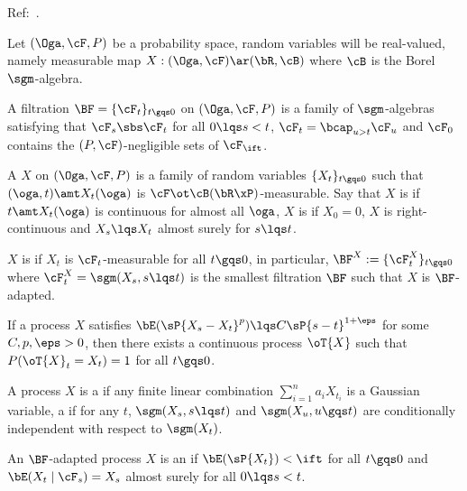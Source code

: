 \documentclass[article, a4paper, twoside]{universal}
\begin{document}
\confighead{}{}{}

Ref:~\cite{JYC2009}.


\begin{stp}
    Let $(\Oga,\cF,P)$ be a probability space, random variables will be real-valued, namely measurable map $X:(\Oga,\cF)\ar(\bR,\cB)$ where $\cB$ is the Borel $\sgm$-algebra.

    A filtration $\BF=\{\cF_{t}\}_{t\gqs0}$ on $(\Oga,\cF,P)$ is a family of $\sgm$-algebras satisfying that $\cF_{s}\sbs\cF_{t}$ for all $0\lqs s < t$, $\cF_{t}=\bcap_{u>t}\cF_{u}$ and $\cF_{0}$ contains the $(P,\cF)$-negligible sets of $\cF_{\ift}$.
\end{stp}

\begin{dfn}[1.1.10]
    A  $X$ on $(\Oga,\cF,P)$ is a family of random variables $\{X_{t}\}_{t\gqs0}$ such that $(\oga,t)\amt X_{t}(\oga)$ is $\cF\ot\cB(\bR\xP)$-measurable. Say that $X$ is  if $t\amt X_{t}(\oga)$ is continuous for almost all $\oga$, $X$ is  if $X_{0}=0$, $X$ is right-continuous and $X_{s}\lqs X_{t}$ almost surely for $s\lqs t$.

    $X$ is  if $X_{t}$ is $\cF_{t}$-measurable for all $t\gqs0$, in particular, $\BF^{X}:=\{\cF_{t}^{X}\}_{t\gqs0}$ where $\cF_{t}^{X}=\sgm(X_{s},s\lqs t)$ is the smallest filtration $\BF$ such that $X$ is $\BF$-adapted.
\end{dfn}

\begin{thm}[1.1.10.6, Kolmogorov]
    If a process $X$ satisfies $\bE(\sP{X_{s}-X_{t}}^{p})\lqs C\sP{s-t}^{1+\eps}$ for some $C,p,\eps>0$, then there exists a continuous process $\oT{X}$ such that $P(\oT{X}_{t}=X_{t})=1$ for all $t\gqs0$.
\end{thm}

\begin{dfn}[1.1.13, 1.1.14]
    A process $X$ is a  if any finite linear combination $\sum_{i=1}^{n}a_{i}X_{t_{i}}$ is a Gaussian variable, a  if for any $t$, $\sgm(X_{s},s\lqs t)$ and $\sgm(X_{u},u\gqs t)$ are conditionally independent with respect to $\sgm(X_{t})$.
\end{dfn}


\begin{dfn}[1.2.1.1]
    An $\BF$-adapted process $X$ is an  if $\bE(\sP{X_{t}})<\ift$ for all $t\gqs0$ and $\bE(X_{t}\mid \cF_{s})=X_{s}$ almost surely for all $0\lqs s < t$.

\end{dfn}
\end{document}
